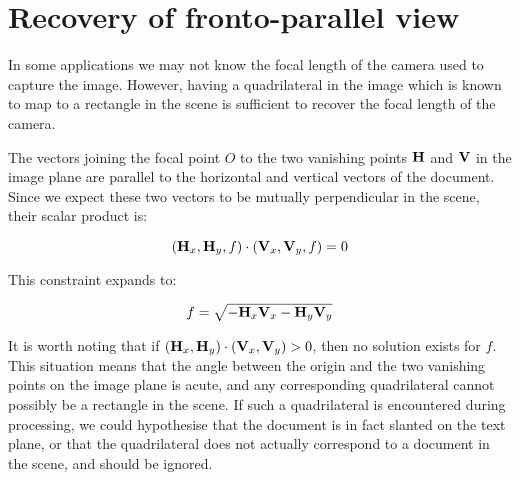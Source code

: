 



\section{Recovery of fronto-parallel view} \label{sec-rectify}


In some applications we may not know the focal length of the camera used to capture the image.  However, having a quadrilateral in the image which is known to map to a rectangle in the scene is sufficient to recover the focal length of the camera.

The vectors joining the focal point $O$ to the two vanishing points ${ \bf H }$ and ${ \bf V }$ in the image plane are parallel to the horizontal and vertical vectors of the document.  Since we expect these two vectors to be mutually perpendicular in the scene, their scalar product is:

\begin{equation}
( { \bf H }_x , { \bf H }_y , f ) \cdot ( { \bf V }_x , { \bf V }_y , f ) = 0
\end{equation}

This constraint expands to:

\begin{equation}
f = \sqrt{ - { \bf H }_x { \bf V }_x - { \bf H }_y { \bf V }_y }
\end{equation}


It is worth noting that if $ ( { \bf H }_x , { \bf H }_y ) \cdot ( { \bf V }_x , { \bf V }_y ) > 0 $, then no solution exists for $f$.  This situation means that the angle between the origin and the two vanishing points on the image plane is acute, and any corresponding quadrilateral cannot possibly be a rectangle in the scene.  If such a quadrilateral is encountered during processing, we could hypothesise that the document is in fact slanted on the text plane, or that the quadrilateral does not actually correspond to a document in the scene, and should be ignored.

